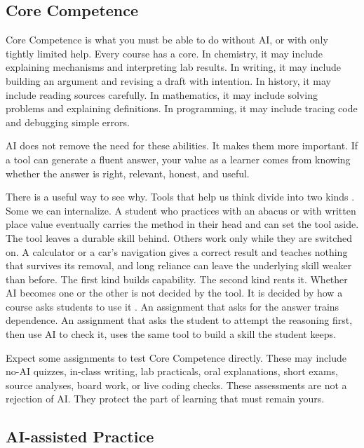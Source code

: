 \documentclass{SIAMbook2023}
\begin{document}
\subsection{Core Competence}
\label{subsec:core-competence}

Core Competence is what you must be able to do without AI, or with only tightly limited help. Every course has a core. In chemistry, it may include explaining mechanisms and interpreting lab results. In writing, it may include building an argument and revising a draft with intention. In history, it may include reading sources carefully. In mathematics, it may include solving problems and explaining definitions. In programming, it may include tracing code and debugging simple errors.

AI does not remove the need for these abilities. It makes them more important. If a tool can generate a fluent answer, your value as a learner comes from knowing whether the answer is right, relevant, honest, and useful.

There is a useful way to see why. Tools that help us think divide into two kinds \citep{norman1991cognitive,krakauer2016hybrid}. Some we can internalize. A student who practices with an abacus or with written place value eventually carries the method in their head and can set the tool aside. The tool leaves a durable skill behind. Others work only while they are switched on. A calculator or a car's navigation gives a correct result and teaches nothing that survives its removal, and long reliance can leave the underlying skill weaker than before. The first kind builds capability. The second kind rents it. Whether AI becomes one or the other is not decided by the tool. It is decided by how a course asks students to use it \citep{bowen2024teaching,watson2024learning}. An assignment that asks for the answer trains dependence. An assignment that asks the student to attempt the reasoning first, then use AI to check it, uses the same tool to build a skill the student keeps.

Expect some assignments to test Core Competence directly. These may include no-AI quizzes, in-class writing, lab practicals, oral explanations, short exams, source analyses, board work, or live coding checks. These assessments are not a rejection of AI. They protect the part of learning that must remain yours.

\subsection{AI-assisted Practice}
\label{subsec:ai-augmented-practice}
\end{document}
